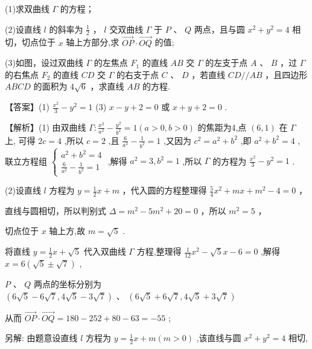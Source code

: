 \documentclass[10pt]{article}
\begin{document}
(1)求双曲线 \(\Gamma\) 的方程；

(2)设直线 \(l\) 的斜率为 \(\frac{1}{2}\) ， \(l\) 交双曲线 \(\Gamma\) 于 \(P\) 、 \(Q\) 两点，且与圆 \({x}^{2} + {y}^{2} = 4\) 相切，切点位于 \(x\) 轴上方部分,求 \(\overrightarrow{OP} \cdot  \overrightarrow{OQ}\) 的值;

(3)如图，设过双曲线 \(\Gamma\) 的左焦点 \({F}_{1}\) 的直线 \({AB}\) 交 \(\Gamma\) 的左支于点 \(A\) 、 \(B\) ，过 \(\Gamma\) 的右焦点 \({F}_{2}\) 的直线 \({CD}\) 交 \(\Gamma\) 的右支于点 \(C\) 、 \(D\) ，若直线 \({CD}//{AB}\) ，且四边形 \({ABCD}\) 的面积为 \(4\sqrt{6}\) ，求直线 \({AB}\) 的方程.

【答案】(1) \(\frac{{x}^{2}}{3} - {y}^{2} = 1\) (3) \(x - y + 2 = 0\) 或 \(x + y + 2 = 0\) .

【解析】(1) 由双曲线 \(\Gamma  : \frac{{x}^{2}}{{a}^{2}} - \frac{{y}^{2}}{{b}^{2}} = 1\left( {a > 0,b > 0}\right)\) 的焦距为4,点 \(\left( {6,1}\right)\) 在 \(\Gamma\) 上, 可得 \({2c} = 4\) ,所以 \(c = 2\) ,且 \(\frac{6}{{a}^{2}} - \frac{1}{{b}^{2}} = 1\) ,又因为 \({c}^{2} = {a}^{2} + {b}^{2}\) ,即 \({a}^{2} + {b}^{2} = 4\) , 联立方程组 \(\left\{  \begin{array}{l} {a}^{2} + {b}^{2} = 4 \\  \frac{6}{{a}^{2}} - \frac{1}{{b}^{2}} = 1 \end{array}\right.\) ,解得 \({a}^{2} = 3,{b}^{2} = 1\) ,所以 \(\Gamma\) 的方程为 \(\frac{{x}^{2}}{3} - {y}^{2} = 1\) .

(2)设直线 \(l\) 方程为 \(y = \frac{1}{2}x + m\) ，代入圆的方程整理得 \(\frac{5}{4}{x}^{2} + {mx} + {m}^{2} - 4 = 0\) ，

直线与圆相切，所以判别式 \(\Delta  = {m}^{2} - 5{m}^{2} + {20} = 0\) ，所以 \({m}^{2} = 5\) ，

切点位于 \(x\) 轴上方,故 \(m = \sqrt{5}\) .

将直线 \(y = \frac{1}{2}x + \sqrt{5}\) 代入双曲线 \(\Gamma\) 方程,整理得 \(\frac{1}{12}{x}^{2} - \sqrt{5}x - 6 = 0\) ,解得 \(x = 6\left( {\sqrt{5} \pm  \sqrt{7}}\right)\) ,

\(P\text{ 、 }Q\) 两点的坐标分别为 \(\left( {6\sqrt{5} - 6\sqrt{7},4\sqrt{5} - 3\sqrt{7}}\right) \text{ 、 }\left( {6\sqrt{5} + 6\sqrt{7},4\sqrt{5} + 3\sqrt{7}}\right)\)

从而 \(\overrightarrow{OP} \cdot  \overrightarrow{OQ} = {180} - {252} + {80} - {63} =  - {55}\) ;

另解: 由题意设直线 \(l\) 方程为 \(y = \frac{1}{2}x + m\left( {m > 0}\right)\) ,该直线与圆 \({x}^{2} + {y}^{2} = 4\) 相切,
\end{document}
